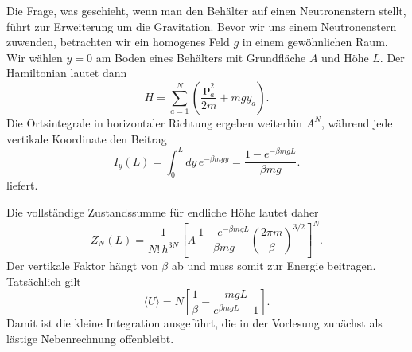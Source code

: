 Die Frage, was geschieht, wenn man den Behälter auf einen Neutronenstern stellt, führt zur Erweiterung um die Gravitation. Bevor wir uns einem Neutronenstern zuwenden, betrachten wir ein homogenes Feld \(g\) in einem gewöhnlichen Raum. Wir wählen \(y=0\) am Boden eines Behälters mit Grundfläche \(A\) und Höhe \(L\). Der Hamiltonian lautet dann
\begin{equation}
 H=\sum_{a=1}^{N}
 \left(\frac{\bm p_a^2}{2m}+mgy_a\right).
 \label{eq:sm4-gravity-hamiltonian}
\end{equation}
Die Ortsintegrale in horizontaler Richtung ergeben weiterhin \(A^N\), während jede vertikale Koordinate den Beitrag
\begin{equation}
 I_y(L)
 =\int_0^Ldy\,e^{-\beta mgy}
 =\frac{1-e^{-\beta mgL}}{\beta mg}.
 \label{eq:sm4-finite-height-integral}
\end{equation} liefert.

\begin{classroomqa}
\end{classroomqa}

Die vollständige Zustandssumme für endliche Höhe lautet daher
\begin{equation}
 Z_N(L)
 =
 \frac{1}{N!\,h^{3N}}
 \left[
  A\,
  \frac{1-e^{-\beta mgL}}{\beta mg}
  \left(\frac{2\pi m}{\beta}\right)^{3/2}
 \right]^N.
 \label{eq:sm4-gravity-partition-finite}
\end{equation}
Der vertikale Faktor hängt von \(\beta\) ab und muss somit zur Energie beitragen. Tatsächlich gilt
\begin{equation}
 \langle U\rangle
 =N\left[
  \frac{1}{\beta}
  -\frac{mgL}{e^{\beta mgL}-1}
 \right].
 \label{eq:sm4-finite-gravity-energy}
\end{equation}
Damit ist die kleine Integration ausgeführt, die in der Vorlesung zunächst als lästige Nebenrechnung offenbleibt.

